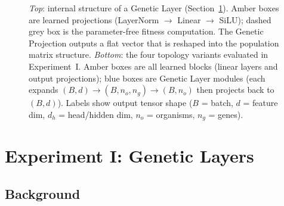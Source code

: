 \documentclass[10pt, a4paper, twocolumn]{article}
\begin{document}
\begin{figure}[!t]
\caption{\emph{Top}: internal structure of a Genetic Layer (Section~\ref{sec:layers}). Amber boxes are learned projections (LayerNorm $\to$ Linear $\to$ SiLU); dashed grey box is the parameter-free fitness computation. The Genetic Projection outputs a flat vector that is reshaped into the population matrix structure. \emph{Bottom}: the four topology variants evaluated in Experiment~I. Amber boxes are all learned blocks (linear layers and output projections); blue boxes are Genetic Layer modules (each expands $(B,d)\!\to\!(B,n_o,n_g)\!\to\!(B,n_o)$ then projects back to $(B,d)$). Labels show output tensor shape ($B$ = batch, $d$ = feature dim, $d_h$ = head/hidden dim, $n_o$ = organisms, $n_g$ = genes).}
\label{fig:arch_exp1}
\end{figure}

\section{Experiment I: Genetic Layers}
\label{sec:layers}

\subsection*{Background}
\end{document}
